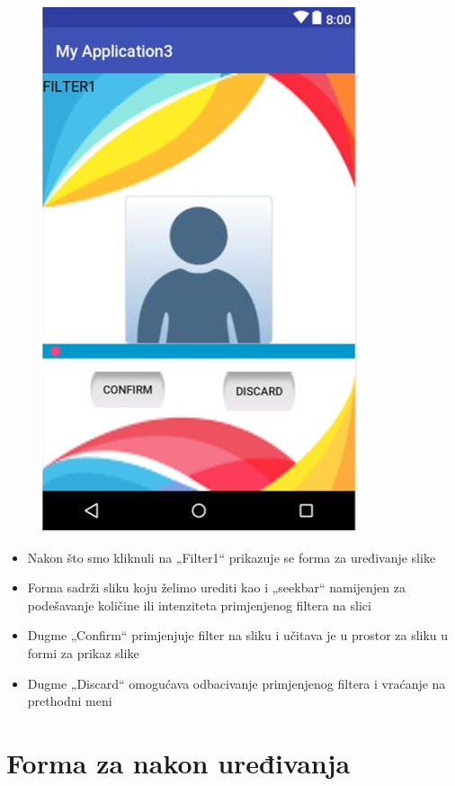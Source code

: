 \documentclass[12pt]{scrreprt}
\begin{document}
\begin{figure}[h]
	\begin{Center}
		\includegraphics{image6}
	\end{Center}
\end{figure}

\begin{itemize}
	\item	Nakon što smo kliknuli na „Filter1“ prikazuje se forma za uređivanje slike
	\item	Forma sadrži sliku koju želimo urediti kao i „seekbar“ namijenjen za podešavanje količine ili intenziteta primjenjenog filtera na slici
	\item	Dugme „Confirm“ primjenjuje filter na sliku i učitava je u prostor za sliku u formi za prikaz slike
	\item	Dugme „Discard“ omogućava odbacivanje primjenjenog filtera i vraćanje na prethodni meni
\end{itemize}

\chapter{Forma za nakon uređivanja}
\end{document}
